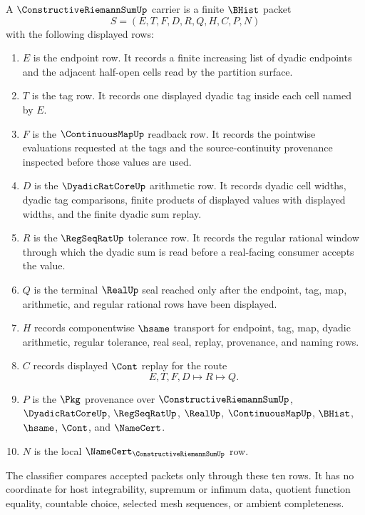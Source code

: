 \begin{definition}
\label{def:constructive-riemann-sum-carrier}
A $\ConstructiveRiemannSumUp$ carrier is a finite $\BHist$ packet
$$
S=(E,T,F,D,R,Q,H,C,P,N)
$$
with the following displayed rows:
\begin{enumerate}
\item $E$ is the endpoint row. It records a finite increasing list of dyadic endpoints and the adjacent half-open cells read by the partition surface.
\item $T$ is the tag row. It records one displayed dyadic tag inside each cell named by $E$.
\item $F$ is the $\ContinuousMapUp$ readback row. It records the pointwise evaluations requested at the tags and the source-continuity provenance inspected before those values are used.
\item $D$ is the $\DyadicRatCoreUp$ arithmetic row. It records dyadic cell widths, dyadic tag comparisons, finite products of displayed values with displayed widths, and the finite dyadic sum replay.
\item $R$ is the $\RegSeqRatUp$ tolerance row. It records the regular rational window through which the dyadic sum is read before a real-facing consumer accepts the value.
\item $Q$ is the terminal $\RealUp$ seal reached only after the endpoint, tag, map, arithmetic, and regular rational rows have been displayed.
\item $H$ records componentwise $\hsame$ transport for endpoint, tag, map, dyadic arithmetic, regular tolerance, real seal, replay, provenance, and naming rows.
\item $C$ records displayed $\Cont$ replay for the route
$$
E,T,F,D \longmapsto R \longmapsto Q .
$$
\item $P$ is the $\Pkg$ provenance over $\ConstructiveRiemannSumUp$, $\DyadicRatCoreUp$, $\RegSeqRatUp$, $\RealUp$, $\ContinuousMapUp$, $\BHist$, $\hsame$, $\Cont$, and $\NameCert$.
\item $N$ is the local $\NameCert_{\ConstructiveRiemannSumUp}$ row.
\end{enumerate}
The classifier compares accepted packets only through these ten rows. It has no coordinate for host integrability, supremum or infimum data, quotient function equality, countable choice, selected mesh sequences, or ambient completeness.
\end{definition}

